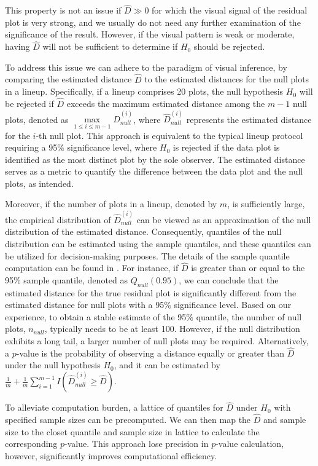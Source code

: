 \documentclass[]{interact}
\theoremstyle{plain}%
\theoremstyle{definition}
\theoremstyle{remark}
\begin{document}
This property is not an issue if \(\hat{D} \gg 0\) for which the visual
signal of the residual plot is very strong, and we usually do not need
any further examination of the significance of the result. However, if
the visual pattern is weak or moderate, having \(\hat{D}\) will not be
sufficient to determine if \(H_0\) should be rejected.

To address this issue we can adhere to the paradigm of visual inference,
by comparing the estimated distance \(\hat{D}\) to the estimated
distances for the null plots in a lineup. Specifically, if a lineup
comprises 20 plots, the null hypothesis \(H_0\) will be rejected if
\(\hat{D}\) exceeds the maximum estimated distance among the \(m - 1\)
null plots, denoted as
\(\max\limits_{1 \leq i \leq m-1} {\hat{D}_{null}^{(i)}}\), where
\(\hat{D}_{null}^{(i)}\) represents the estimated distance for the
\(i\)-th null plot. This approach is equivalent to the typical lineup
protocol requiring a 95\% significance level, where \(H_0\) is rejected
if the data plot is identified as the most distinct plot by the sole
observer. The estimated distance serves as a metric to quantify the
difference between the data plot and the null plots, as intended.

Moreover, if the number of plots in a lineup, denoted by \(m\), is
sufficiently large, the empirical distribution of
\({\hat{D}_{null}^{(i)}}\) can be viewed as an approximation of the null
distribution of the estimated distance. Consequently, quantiles of the
null distribution can be estimated using the sample quantiles, and these
quantiles can be utilized for decision-making purposes. The details of
the sample quantile computation can be found in
\citet{hyndman1996sample}. For instance, if \(\hat{D}\) is greater than
or equal to the 95\% sample quantile, denoted as \(Q_{null}(0.95)\), we
can conclude that the estimated distance for the true residual plot is
significantly different from the estimated distance for null plots with
a 95\% significance level. Based on our experience, to obtain a stable
estimate of the 95\% quantile, the number of null plots, \(n_{null}\),
typically needs to be at least 100. However, if the null distribution
exhibits a long tail, a larger number of null plots may be required.
Alternatively, a \(p\)-value is the probability of observing a distance
equally or greater than \(\hat{D}\) under the null hypothesis \(H_0\),
and it can be estimated by
\(\frac{1}{m} + \frac{1}{m}\sum_{i=1}^{m-1}I\left(\hat{D}_{null}^{(i)} \geq \hat{D}\right)\).

To alleviate computation burden, a lattice of quantiles for \(\hat{D}\)
under \(H_0\) with specified sample sizes can be precomputed. We can
then map the \(\hat{D}\) and sample size to the closet quantile and
sample size in lattice to calculate the corresponding \(p\)-value. This
approach lose precision in \(p\)-value calculation, however,
significantly improves computational efficiency.
\end{document}
